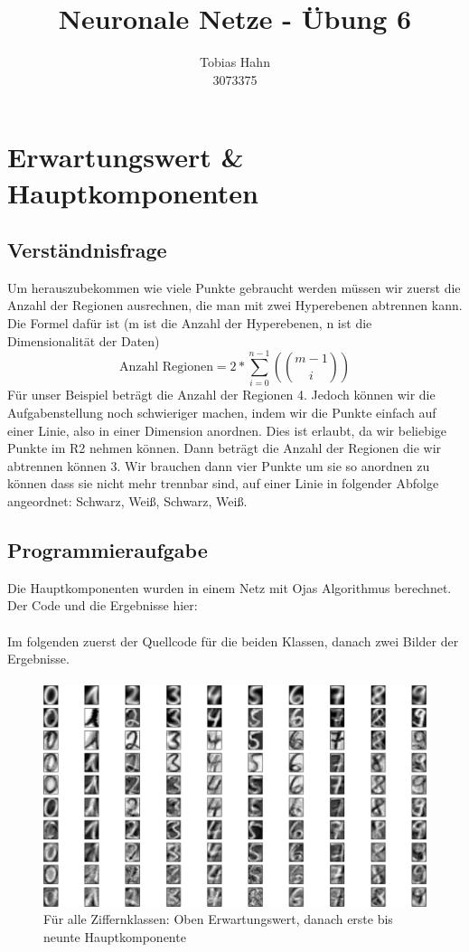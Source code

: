 \documentclass{article}
\title{Neuronale Netze - Übung 6}
\author{Tobias Hahn\\ 3073375}
\begin{document}
\maketitle
\newpage
\section{Erwartungswert \& Hauptkomponenten}
\subsection{Verständnisfrage}
Um herauszubekommen wie viele Punkte gebraucht werden müssen wir zuerst die Anzahl der Regionen ausrechnen, die man mit zwei Hyperebenen abtrennen kann. Die Formel dafür ist (m ist die Anzahl der Hyperebenen, n ist die Dimensionalität der Daten)
\[
 \text{Anzahl Regionen} = 2 * \sum_{i=0}^{n-1}{(\binom{m-1}{i})} 
\]
Für unser Beispiel beträgt die Anzahl der Regionen 4. Jedoch können wir die Aufgabenstellung noch schwieriger machen, indem wir die Punkte einfach auf einer Linie, also in einer Dimension anordnen. Dies ist erlaubt, da wir beliebige Punkte im R2 nehmen können. Dann beträgt die Anzahl der Regionen die wir abtrennen können 3. Wir brauchen dann vier Punkte um sie so anordnen zu können dass sie nicht mehr trennbar sind, auf einer Linie in folgender Abfolge angeordnet: Schwarz, Weiß, Schwarz, Weiß.

\subsection{Programmieraufgabe}
Die Hauptkomponenten wurden in einem Netz mit Ojas Algorithmus berechnet. Der Code und die Ergebnisse hier:

\paragraph{}
Im folgenden zuerst der Quellcode für die beiden Klassen, danach zwei Bilder der Ergebnisse.
\paragraph{}



\begin{figure}[h]
\caption{Für alle Ziffernklassen: Oben Erwartungswert, danach erste bis neunte Hauptkomponente}
\centering
\includegraphics[width=\textwidth]{klassen}
\end{figure}
\end{document}
